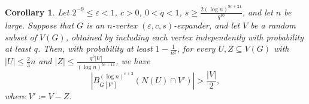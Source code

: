\documentclass[10pt]{article}
\theoremstyle{plain}
\numberwithin{theorem}{section}
\newtheorem{corollary}[theorem]{Corollary}
\theoremstyle{definition}
\theoremstyle{remark}
\renewcommand{\setminus}{-}
\newcommand{\eps}{\varepsilon}
\theoremstyle{plain}
\begin{document}
\begin{corollary}\label{cor:expansion-random}
			Let $2^{-9} \le \eps < 1$, $c > 0$, $0 < q < 1$, $s \ge \frac{2 (\log n)^{9c+21}}{q^{10}}$, and let $n$ be large. Suppose that $G$ is an $n$-vertex $(\eps, c, s)$-expander, and let $V$ be a random subset of $V(G)$, obtained by including each vertex independently with probability at least $q$. Then, with probability at least $1 - \frac{1}{n^2}$, for every $U, Z \subseteq V(G)$ with $|U| \le \frac{2}{3}n$ and $|Z| \le \frac{q^5|U|}{(\log n)^{5c+11}}$, we have 
			\begin{equation} \label{eqn:NU-expand}
				\left|B^{(\log n)^{c+2}}_{G[V']}\left(N(U) \cap V'\right)\right| > \frac{|V|}{2},
			\end{equation}
			where $V' \coloneqq V \setminus Z$.
		\end{corollary}
\end{document}
